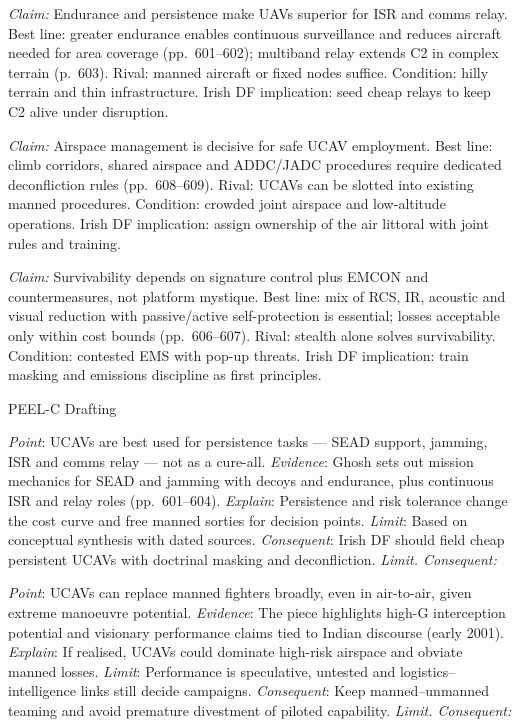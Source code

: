 \textit{Claim:} Endurance and persistence make UAVs superior for ISR and comms relay.
Best line: greater endurance enables continuous surveillance and reduces aircraft needed for area coverage (pp.~601–602); multiband relay extends C2 in complex terrain (p.~603). Rival: manned aircraft or fixed nodes suffice. Condition: hilly terrain and thin infrastructure. Irish DF implication: seed cheap relays to keep C2 alive under disruption.

\textit{Claim:} Airspace management is decisive for safe UCAV employment.
Best line: climb corridors, shared airspace and ADDC/JADC procedures require dedicated deconfliction rules (pp.~608–609). Rival: UCAVs can be slotted into existing manned procedures. Condition: crowded joint airspace and low-altitude operations. Irish DF implication: assign ownership of the air littoral with joint rules and training.

\textit{Claim:} Survivability depends on signature control plus EMCON and countermeasures, not platform mystique.
Best line: mix of RCS, IR, acoustic and visual reduction with passive/active self-protection is essential; losses acceptable only within cost bounds (pp.~606–607). Rival: stealth alone solves survivability. Condition: contested EMS with pop-up threats. Irish DF implication: train masking and emissions discipline as first principles.

PEEL-C Drafting

\textit{Point}: UCAVs are best used for persistence tasks — SEAD support, jamming, ISR and comms relay — not as a cure-all.
\textit{Evidence}: Ghosh sets out mission mechanics for SEAD and jamming with decoys and endurance, plus continuous ISR and relay roles (pp.~601–604).
\textit{Explain}: Persistence and risk tolerance change the cost curve and free manned sorties for decision points.
\textit{Limit}: Based on conceptual synthesis with dated sources.
\textit{Consequent}: Irish DF should field cheap persistent UCAVs with doctrinal masking and deconfliction.
\textit{Limit. Consequent:}

\textit{Point}: UCAVs can replace manned fighters broadly, even in air-to-air, given extreme manoeuvre potential.
\textit{Evidence}: The piece highlights high-G interception potential and visionary performance claims tied to Indian discourse (early 2001).
\textit{Explain}: If realised, UCAVs could dominate high-risk airspace and obviate manned losses.
\textit{Limit}: Performance is speculative, untested and logistics–intelligence links still decide campaigns.
\textit{Consequent}: Keep manned–unmanned teaming and avoid premature divestment of piloted capability.
\textit{Limit. Consequent:}


